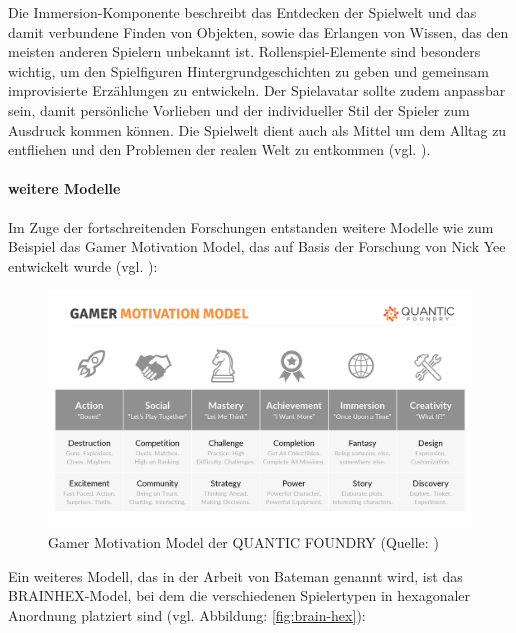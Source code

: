 Die Immersion-Komponente beschreibt das Entdecken der Spielwelt und das damit verbundene Finden von Objekten, sowie das Erlangen von Wissen, das den meisten anderen Spielern unbekannt ist. Rollenspiel-Elemente sind besonders wichtig, um den Spielfiguren Hintergrundgeschichten zu geben und gemeinsam improvisierte Erzählungen zu entwickeln. Der Spielavatar sollte zudem anpassbar sein, damit persönliche Vorlieben und der individueller Stil der Spieler zum Ausdruck kommen können. Die Spielwelt dient auch als Mittel um dem Alltag zu entfliehen und den Problemen der realen Welt zu entkommen (vgl. \citealp[S. 6]{yee_motivations_2006}).

\paragraph{weitere Modelle}
Im Zuge der fortschreitenden Forschungen entstanden weitere Modelle wie zum Beispiel das Gamer Motivation Model, das auf Basis der Forschung von Nick Yee entwickelt wurde (vgl. \citealp{institut_fur_ludologie_spielertypen_nodate}):

\begin{figure}[ht]
\centering
\includegraphics[width=1\linewidth]{content/pictures/gamer_motivations_model.png}
\caption{Gamer Motivation Model der QUANTIC FOUNDRY (Quelle: \citealp{noauthor_quantic_nodate})}
\label{fig:gamer_motivation_model}
\end{figure}

Ein weiteres Modell, das in der Arbeit von Bateman genannt wird, ist das BRAINHEX-Model, bei dem die verschiedenen Spielertypen in hexagonaler Anordnung platziert sind (vgl. Abbildung: \ref{fig:brain-hex}):


